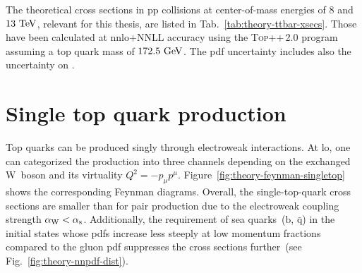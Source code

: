 The theoretical \ttbar cross sections in pp collisions at center-of-mass energies of $8$ and $13~\mathrm{TeV}$, relevant for this thesis, are listed in Tab.~\ref{tab:theory-ttbar-xsecs}. Those have been calculated at \gls{nnlo}+NNLL accuracy using the \textsc{Top++}\,2.0 program~\cite{Czakon:2011xx,Czakon:2013goa} assuming a top quark mass of $172.5~\mathrm{GeV}$. The \gls{pdf} uncertainty includes also the uncertainty on \as.




\section{Single top quark production}
\label{sec:theory-single-top-production}

Top quarks can be produced singly through electroweak interactions. At \gls{lo}, one can categorized the production into three channels depending on the exchanged $\mathrm{W}$~boson and its virtuality $Q^{2}=-p_{\mu}p^{\mu}$. Figure~\ref{fig:theory-feynman-singletop} shows the corresponding Feynman diagrams. Overall, the single-top-quark cross sections are smaller than for pair production due to the electroweak coupling strength ${\alpha_\mathrm{W}}<{\alpha_\mathrm{s}}$. Additionally, the requirement of sea quarks~($\mathrm{b}$, $\bar{\mathrm{q}}$) in the initial states whose \glspl{pdf} increase less steeply at low momentum fractions compared to the gluon \gls{pdf} suppresses the cross sections further~(see Fig.~\ref{fig:theory-nnpdf-dist}).

